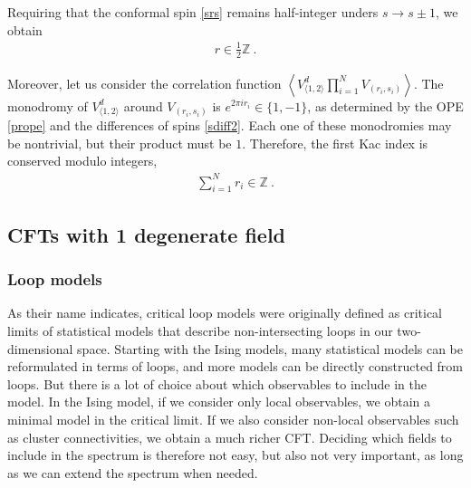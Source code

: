 \documentclass[12pt, a4paper]{article}
\theoremstyle{break}
\begin{document}
 Requiring that the conformal spin \eqref{srs} remains half-integer unders $s\to s\pm 1$, we obtain
 \begin{align}
  \boxed{r\in \frac12\mathbb{Z}}\ .
  \label{rihz}
 \end{align}
\iffalse
\begin{align}
 \begin{array}{|c|c|c|c|c|}
 \hline 
  \text{Spectrum} & \text{Degenerate field} & \text{Shifts} & \text{Spins} & \text{Constraint} 
  \\
  \hline \hline 
  \mathcal{S} & V^d_{\langle 1,3\rangle} & s\to s\pm 2 &   S\in \mathbb{Z} & r\in\frac12\mathbb{Z} 
  \\
  \hline 
  \mathcal{S}\text{ or }\widetilde{\mathcal{S}}  & V^d_{\langle 1,2\rangle} & s\to s\pm 1&  S\in \mathbb{Z} & r\in\mathbb{Z} 
 \\
 \hline 
 \widetilde{\mathcal{S}}  & V^d_{\langle 1,2\rangle}& s\to s\pm 1 &  S\in \frac12\mathbb{Z} & r\in\frac12\mathbb{Z} 
 \\
 \hline 
 \end{array}
 \label{rcon}
\end{align}
\fi
Moreover, let us  consider the correlation function $\left<V^d_{\langle 1,2\rangle}\prod_{i=1}^NV_{(r_i,s_i)}\right>$. 
The monodromy of $V^d_{\langle 1,2\rangle}$  around $V_{(r_i,s_i)}$ is $e^{2\pi ir_i}\in \{1,-1\}$, as determined by the OPE \eqref{prope} and the differences of spins \eqref{sdiff2}. Each one of these monodromies may be nontrivial, but their product must be $1$. Therefore, the first Kac index is conserved modulo integers,
\begin{align}
 \boxed{\sum_{i=1}^N r_i  \in \mathbb{Z}}\ . 
 \label{sriz}
\end{align}


\subsection{CFTs with 1 degenerate field}

\subsubsection{Loop models}

As their name indicates, critical loop models were originally defined as critical limits of statistical models that describe non-intersecting loops in our two-dimensional space. Starting with the Ising models, many statistical models can be reformulated in terms of loops, and more models can be directly constructed from loops. But there is a lot of choice about which observables to include in the model. In the Ising model, if we consider only local observables, we obtain a minimal model in the critical limit. If we also consider non-local observables such as cluster connectivities, we obtain a much richer CFT. Deciding which fields to include in the spectrum is therefore not easy, but also not very important, as long as we can extend the spectrum when needed. 
\end{document}
